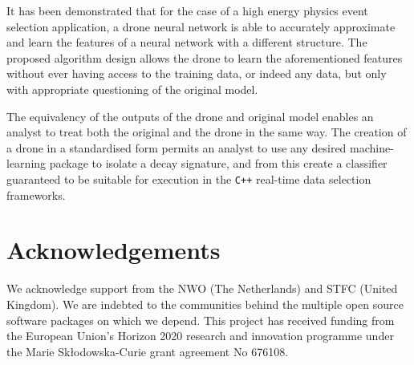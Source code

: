 \documentclass[final,5p,times,twocolumn]{elsarticle}
\begin{document}
It has been demonstrated that for the case of a high energy physics
event selection application, a drone neural network is able to accurately
approximate and learn the features of a neural network with a different
structure. The proposed algorithm design allows the drone to learn the
aforementioned features without ever having access to the training data,
or indeed any data, but only with appropriate questioning of the original model.

The equivalency of the outputs of the drone and original model enables an
analyst to treat both the original and the drone in the same way. The creation
of a drone in a standardised form permits an analyst to use any desired machine-learning
package to isolate a decay signature, and from this create a classifier
guaranteed to be suitable for execution in the {\tt C++} real-time data selection frameworks.


\section*{Acknowledgements}

\noindent 
We acknowledge support from 
the NWO (The Netherlands) and STFC (United Kingdom).
We are indebted to the communities behind the multiple open 
source software packages on which we depend.
This project has received funding from the European Union’s Horizon 
2020 research and innovation programme under the Marie Skłodowska-Curie 
grant agreement No 676108.
\end{document}
